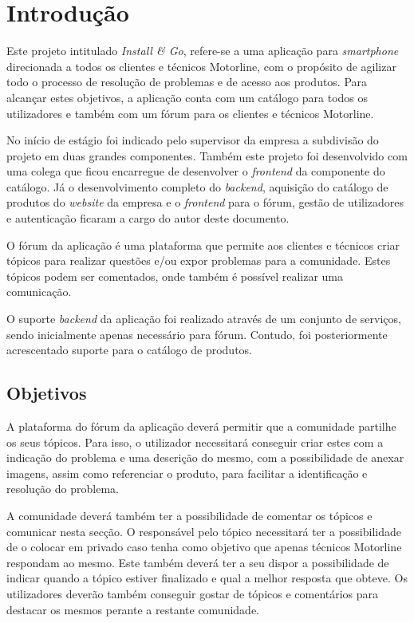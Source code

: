 
\chapter{Introdução}

Este projeto intitulado \textit{Install \& Go}, refere-se a uma aplicação para \textit{smartphone} direcionada a todos os clientes e 
técnicos Motorline, com o propósito de agilizar todo o processo de resolução de problemas e de acesso 
aos produtos. Para alcançar estes objetivos, a aplicação conta com um catálogo para todos os utilizadores 
e também com um fórum para os clientes e técnicos Motorline.

No início de estágio foi indicado pelo supervisor da empresa a subdivisão do projeto em duas grandes componentes. Também este projeto foi desenvolvido com uma colega que ficou encarregue de desenvolver o \textit{frontend} da componente do catálogo. Já o desenvolvimento completo do \textit{backend}, aquisição do catálogo de produtos do \textit{website} da empresa e o \textit{frontend} para o fórum, gestão de utilizadores e autenticação ficaram a cargo do autor deste documento.

O fórum da aplicação é uma plataforma que permite aos clientes e técnicos criar tópicos para realizar questões e/ou expor problemas para a comunidade. Estes tópicos podem ser comentados, onde também é possível realizar uma comunicação.

O suporte \textit{backend} da aplicação foi realizado através de um conjunto de serviços, sendo inicialmente apenas necessário para fórum. Contudo, foi posteriormente acrescentado suporte para o catálogo de produtos.


\section{Objetivos}
A plataforma do fórum da aplicação deverá permitir que a comunidade partilhe os seus tópicos. Para isso, o utilizador necessitará conseguir criar estes com a indicação do problema e uma descrição do mesmo, com a possibilidade de anexar imagens, assim como referenciar o produto, para facilitar a identificação e resolução do problema.

A comunidade deverá também ter a possibilidade de comentar os tópicos e comunicar nesta secção. O responsável pelo tópico necessitará ter a possibilidade de o colocar em privado caso tenha como objetivo que apenas técnicos Motorline respondam ao mesmo. Este também deverá ter a seu dispor a possibilidade de indicar quando a tópico estiver finalizado e qual a melhor resposta que obteve. Os utilizadores deverão também conseguir gostar de tópicos e comentários para destacar os mesmos perante a restante comunidade.

